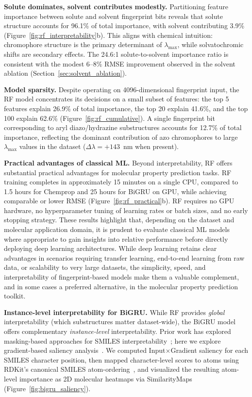 \documentclass[11pt,a4paper]{article}
\begin{document}
\textbf{Solute dominates, solvent contributes modestly.}
Partitioning feature importance between solute and solvent fingerprint bits reveals that solute structure accounts for 96.1\% of total importance, with solvent contributing 3.9\% (Figure~\ref{fig:rf_interpretability}b).
This aligns with chemical intuition: chromophore structure is the primary determinant of $\lambda_{\max}$, while solvatochromic shifts are secondary effects.
The 24.6:1 solute-to-solvent importance ratio is consistent with the modest 6--8\% RMSE improvement observed in the solvent ablation (Section~\ref{sec:solvent_ablation}).

\textbf{Model sparsity.}
Despite operating on 4096-dimensional fingerprint input, the RF model concentrates its decisions on a small subset of features: the top 5 features explain 26.9\% of total importance, the top 20 explain 41.6\%, and the top 100 explain 62.6\% (Figure~\ref{fig:rf_cumulative}).
A single fingerprint bit corresponding to aryl diazo/hydrazine substructures accounts for 12.7\% of total importance, reflecting the dominant contribution of azo chromophores to large $\lambda_{\max}$ values in the dataset ($\Delta\lambda = +143$~nm when present).

\textbf{Practical advantages of classical ML.}
Beyond interpretability, RF offers substantial practical advantages for molecular property prediction tasks.
RF training completes in approximately 15 minutes on a single CPU, compared to 1.5 hours for Chemprop and 25 hours for BiGRU on GPU, while achieving comparable or lower RMSE (Figure~\ref{fig:rf_practical}b).
RF requires no GPU hardware, no hyperparameter tuning of learning rates or batch sizes, and no early stopping strategy.
These results highlight that, depending on the dataset and molecular application domain, it is prudent to evaluate classical ML models where appropriate to gain insights into relative performance before directly deploying deep learning architectures.
While deep learning retains clear advantages in scenarios requiring transfer learning, end-to-end learning from raw data, or scalability to very large datasets, the simplicity, speed, and interpretability of fingerprint-based models make them a valuable complement, and in some cases a preferred alternative, in the molecular property prediction toolkit.

\textbf{Instance-level interpretability for BiGRU.}
While RF provides \emph{global} interpretability (which substructures matter dataset-wide), the BiGRU model offers complementary \emph{instance-level} interpretability.
Prior work has explored masking-based approaches for SMILES interpretability~\cite{gohSMILES2VecInterpretableGeneralPurpose2018}; here we explore gradient-based saliency analysis~\cite{simonyan2014deep}.
We computed Input$\times$Gradient saliency for each SMILES character position, then mapped character-level scores to atoms using RDKit's canonical SMILES atom-ordering~\cite{landrumRdkitRdkit2020_03_12020}, and visualized the resulting atom-level importance as 2D molecular heatmaps via SimilarityMaps~\cite{riniker2013similarity} (Figure~\ref{fig:bigru_saliency}).
\end{document}
